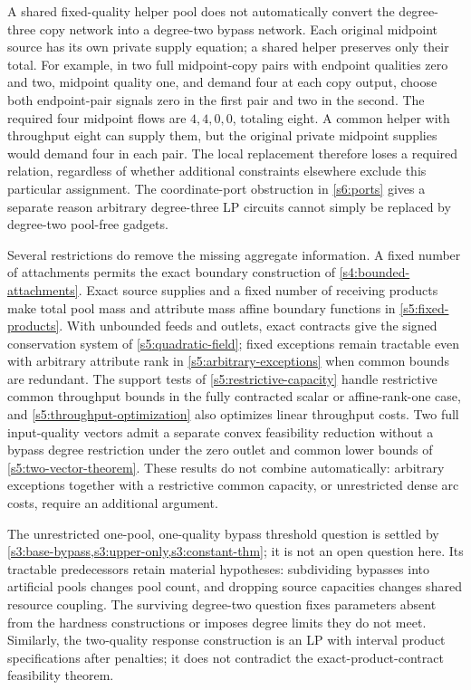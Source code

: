 A shared fixed-quality helper pool does not automatically convert the
degree-three copy network into a degree-two bypass network. Each original
midpoint source has its own private supply equation; a shared helper
preserves only their total. For example, in two full midpoint-copy
pairs with endpoint qualities zero and two, midpoint quality one,
and demand four at each copy output, choose both endpoint-pair signals
zero in the first pair and two in the second. The required four midpoint
flows are $4,4,0,0$, totaling eight. A common helper with throughput eight
can supply them, but the original private midpoint supplies would demand
four in each pair. The local replacement therefore loses a required
relation, regardless of whether additional constraints elsewhere exclude
this particular assignment. The coordinate-port obstruction in
\cref{s6:ports} gives a separate reason arbitrary degree-three LP circuits
cannot simply be replaced by degree-two pool-free gadgets.

Several restrictions do remove the missing aggregate information.
A fixed number of attachments permits the exact boundary construction
of \cref{s4:bounded-attachments}. Exact source supplies and a fixed
number of receiving products make total pool mass and attribute mass
affine boundary functions in \cref{s5:fixed-products}. With unbounded
feeds and outlets, exact contracts give the signed conservation system
of \cref{s5:quadratic-field}; fixed exceptions remain tractable even
with arbitrary attribute rank in \cref{s5:arbitrary-exceptions} when
common bounds are redundant. The support tests of
\cref{s5:restrictive-capacity} handle restrictive common throughput
bounds in the fully contracted scalar or affine-rank-one case, and
\cref{s5:throughput-optimization} also optimizes linear throughput
costs. Two full input-quality vectors admit a separate convex feasibility
reduction without a bypass degree restriction under the zero outlet
and common lower bounds of \cref{s5:two-vector-theorem}.
These results do not combine automatically: arbitrary exceptions together
with a restrictive common capacity, or unrestricted dense arc costs,
require an additional argument.

The unrestricted one-pool, one-quality bypass threshold question is
settled by \cref{s3:base-bypass,s3:upper-only,s3:constant-thm}; it is not
an open question here. Its tractable predecessors retain material
hypotheses: subdividing bypasses into artificial pools changes pool
count, and dropping source capacities changes shared resource coupling.
The surviving degree-two question fixes parameters absent from the
hardness constructions or imposes degree limits they do not meet.
Similarly, the two-quality response construction is an LP with interval
product specifications after penalties; it does not contradict the
exact-product-contract feasibility theorem.

